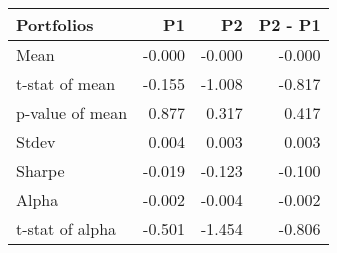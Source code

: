 \begin{tabular}{lrrr}
\toprule
Portfolios & P1 & P2 & P2 - P1 \\
\midrule
Mean & -0.000 & -0.000 & -0.000 \\
t-stat of mean & -0.155 & -1.008 & -0.817 \\
p-value of mean & 0.877 & 0.317 & 0.417 \\
Stdev & 0.004 & 0.003 & 0.003 \\
Sharpe & -0.019 & -0.123 & -0.100 \\
Alpha & -0.002 & -0.004 & -0.002 \\
t-stat of alpha & -0.501 & -1.454 & -0.806 \\
\bottomrule
\end{tabular}
